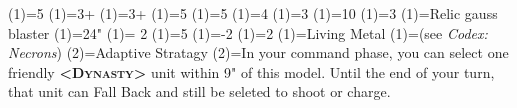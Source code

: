 \renewcommand{\UnitName}{Royal Warden }%
\renewcommand{\UnitPower}{4}%
\renewcommand{\UnitIcon}{HQ.svg}%
%
\renewcommand{\StatBlocks}{1}%
\Movement(1)={5}%
\WeaponSkill(1)={3+}%
\BalisticSkill(1)={3+}%
\Strength(1)={5}%
\Toughness(1)={5}%
\Wounds(1)={4}%
\Attacks(1)={3}%
\Leadership(1)={10}%
\Save(1)={3}%
%
\renewcommand{\UnitText}{1 \UnitName equiped with: \WeaponName(1).}%
%
%
\renewcommand{\NumWeapon}{1}%
\WeaponName(1)={Relic gauss blaster}%
\WeaponRange(1)={24"}%
\WeaponType(1)={ 2}%
\WeaponStrength(1)={5}%
\WeaponAP(1)={-2}%
\WeaponDamage(1)={2}%
%
\renewcommand{\NumAbilities}{1}%
\AbilityName(1)={Living Metal}%
\AbilityDescription(1)={(see \textit{Codex: Necrons})}%
%
\AbilityName(2)={Adaptive Stratagy}%
\AbilityDescription(2)={In your command phase, you can select one friendly \textsc{\textbf{<Dynasty>}} unit within 9" of this model.  Until the end of your turn, that unit can Fall Back and still be seleted to shoot or charge.}%
%
\renewcommand{\FactionKeywords}{Necrons, <Dynasty>}%
\renewcommand{\Keywords}{Infantry, Character, Royal Warden}%
\newcommand{\ExtraFrontTitle}{\AbilityName(2)}%
\renewcommand{\ExtraFrontText}{\AbilityDescription(2)}%
\endinput%
